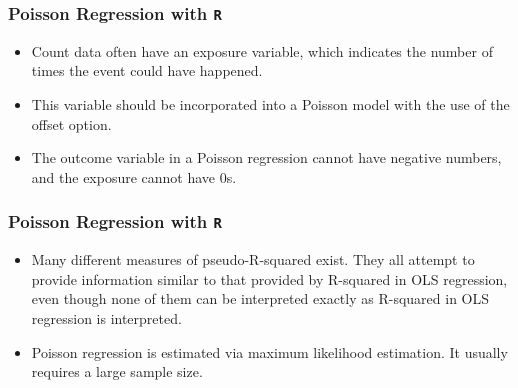 \begin{frame}[fragile]
	\frametitle{Poisson Regression with \texttt{R}}
	\Large
	\begin{itemize} 
\item Count data often have an exposure variable, which indicates the number of times the event could have happened. 
\item This variable should be incorporated into a Poisson model with the use of the offset option.
\item The outcome variable in a Poisson regression cannot have negative numbers, and the exposure cannot have 0s.
\end{itemize}
\end{frame}
\begin{frame}[fragile]
	\frametitle{Poisson Regression with \texttt{R}}
	\Large
	\begin{itemize} 

\item Many different measures of pseudo-R-squared exist. They all attempt to provide information similar to that provided by R-squared in OLS regression, even though none of them can be interpreted exactly as R-squared in OLS regression is interpreted.
 
\item Poisson regression is estimated via maximum likelihood estimation. It usually requires a large sample size. 
\end{itemize}
\end{frame}



